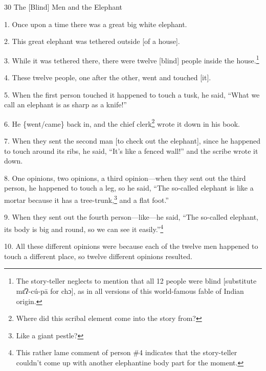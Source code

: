 
30 The [Blind] Men and the Elephant

1. Once upon a time there was a great big white elephant.

2. This great elephant was tethered outside [of a house].

3. While it was tethered there, there were twelve [blind] people inside the house.\footnote{The story-teller neglects to mention that all 12 people were blind [substitute mɛ̂ʔ-cú-pā for chɔ], as in all versions of this world-famous fable of Indian origin.}

4. These twelve people, one after the other, went and touched [it].

5. When the first person touched it happened to touch a tusk, he said, ``What we
call an elephant is as sharp as a knife!''

6. He \{went/came\} back in, and the chief clerk\footnote{Where did this scribal element come into the story from?} wrote it down in his book.

7. When they sent the second man [to check out the elephant], since he happened
to touch around its ribs, he said, ``It's like a fenced wall!'' and the scribe
wrote it down.

8. One opinions, two opinions, a third opinion---when they sent out the third person,
he happened to touch a leg, so he said, ``The so-called elephant is like a mortar
because it has a tree-trunk,\footnote{Like a giant pestle?} and a flat foot.''

9. When they sent out the fourth person---like---he said, ``The so-called elephant,
its body is big and round, so we can see it easily.''\footnote{This rather lame comment of person \#4 indicates that the story-teller couldn't come up with another elephantine body part for the moment.}

10. All these different opinions were because each of the twelve men happened to
touch a different place, so twelve different opinions resulted.

